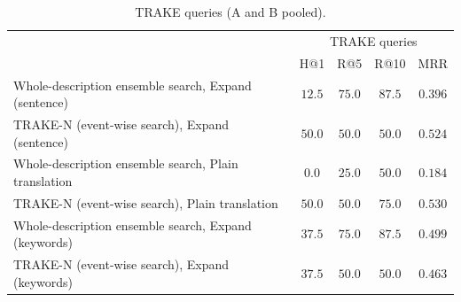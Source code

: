 \begin{table}[t]
\centering
\small
\renewcommand{\arraystretch}{1.35}
\setlength{\tabcolsep}{5pt}
\caption{TRAKE queries (A and B pooled).}
\label{tab:trake}
\begin{tabular}{l|cccc}
\hline
 & \multicolumn{4}{c}{TRAKE queries} \\
 & H@1 & R@5 & R@10 & MRR \\
\hline
Whole-description ensemble search, Expand (sentence) & $12.5$ & $\mathbf{75.0}$ & $\mathbf{87.5}$ & $0.396$ \\
TRAKE-N (event-wise search), Expand (sentence) & $\mathbf{50.0}$ & $50.0$ & $50.0$ & $0.524$ \\
Whole-description ensemble search, Plain translation & $0.0$ & $25.0$ & $50.0$ & $0.184$ \\
TRAKE-N (event-wise search), Plain translation & $\mathbf{50.0}$ & $50.0$ & $75.0$ & $\mathbf{0.530}$ \\
Whole-description ensemble search, Expand (keywords) & $37.5$ & $\mathbf{75.0}$ & $\mathbf{87.5}$ & $0.499$ \\
TRAKE-N (event-wise search), Expand (keywords) & $37.5$ & $50.0$ & $50.0$ & $0.463$ \\
\hline
\end{tabular}
\end{table}
